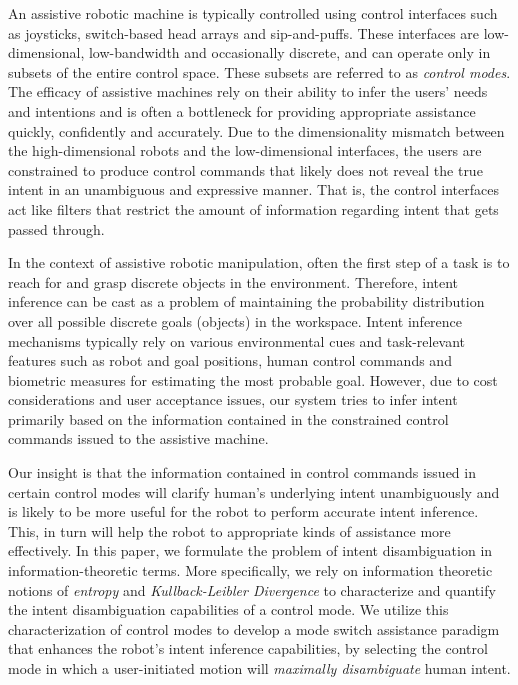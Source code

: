 \documentclass[conference]{IEEEtran}
\begin{document}
An assistive robotic machine is typically controlled using control interfaces such as joysticks, switch-based head arrays and sip-and-puffs. These interfaces are low-dimensional, low-bandwidth and occasionally discrete, and can operate only in subsets of the entire control space. These subsets are referred to as \textit{control modes}. The efficacy of assistive machines rely on their ability to infer the users' needs and intentions and is often a bottleneck for providing appropriate assistance quickly, confidently and accurately. Due to the dimensionality mismatch between the high-dimensional robots and the low-dimensional interfaces, the users are constrained to produce control commands that likely does not reveal the true intent in an unambiguous and expressive manner. That is, the control interfaces act like filters that restrict the amount of information regarding intent that gets passed through. 

In the context of assistive robotic manipulation, often the first step of a task is to reach for and grasp discrete objects in the environment. Therefore, intent inference can be cast as a problem of maintaining the probability distribution over all possible discrete goals (objects) in the workspace. Intent inference mechanisms typically rely on various environmental cues and task-relevant features such as robot and goal positions, human control commands and biometric measures for estimating the most probable goal. However, due to cost considerations and user acceptance issues, our system tries to infer intent primarily based on the information contained in the constrained control commands issued to the assistive machine.

Our insight is that the information contained in control commands issued in certain control modes will clarify human's underlying intent unambiguously and is likely to be more useful for the robot to perform accurate intent inference. This, in turn will help the robot to appropriate kinds of assistance more effectively. In this paper, we formulate the problem of intent disambiguation in information-theoretic terms. More specifically, we rely on information theoretic notions of \textit{entropy} and \textit{Kullback-Leibler Divergence} to characterize and quantify the intent disambiguation capabilities of a control mode. We utilize this characterization of control modes to develop a mode switch assistance paradigm that enhances the robot's intent inference capabilities, by selecting the control mode in which a user-initiated motion will \textit{maximally disambiguate} human intent. 
\end{document}
